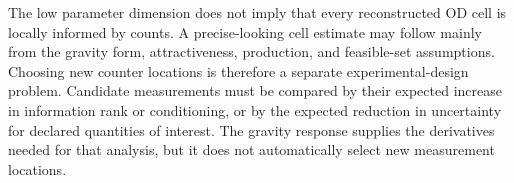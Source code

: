 The low parameter dimension does not imply that every reconstructed OD cell is
locally informed by counts. A precise-looking cell estimate may follow mainly
from the gravity form, attractiveness, production, and feasible-set assumptions.
Choosing new counter locations is therefore a separate experimental-design
problem. Candidate measurements must be compared by their expected increase in
information rank or conditioning, or by the expected reduction in uncertainty
for declared quantities of interest. The gravity response supplies the
derivatives needed for that analysis, but it does not automatically select new
measurement locations.
